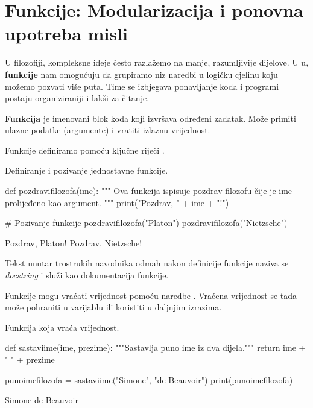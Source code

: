 \section{Funkcije: Modularizacija i ponovna upotreba misli}
\label{sec:funkcije}

U filozofiji, kompleksne ideje često razlažemo na manje, razumljivije dijelove. U u, \textbf{funkcije} nam omogućuju da grupiramo niz naredbi u logičku cjelinu koju možemo pozvati više puta. Time se izbjegava ponavljanje koda i programi postaju organiziraniji i lakši za čitanje.

\begin{definicijaokvir}
    \textbf{Funkcija} je imenovani blok koda koji izvršava određeni zadatak. Može primiti ulazne podatke (argumente) i vratiti izlaznu vrijednost.
\end{definicijaokvir}

Funkcije definiramo pomoću ključne riječi .

\begin{primjerokvir}
    Definiranje i pozivanje jednostavne funkcije.
    \begin{pythoncode}
def pozdravifilozofa(ime):
    """
    Ova funkcija ispisuje pozdrav filozofu čije je ime
    prolijeđeno kao argument.
    """
    print("Pozdrav, " + ime + "!")

# Pozivanje funkcije
pozdravifilozofa("Platon")
pozdravifilozofa("Nietzsche")
    \end{pythoncode}
    \begin{codeoutput}
Pozdrav, Platon!
Pozdrav, Nietzsche!
    \end{codeoutput}
    Tekst unutar trostrukih navodnika odmah nakon definicije funkcije naziva se \textit{docstring} i služi kao dokumentacija funkcije.
\end{primjerokvir}

Funkcije mogu vraćati vrijednost pomoću naredbe . Vraćena vrijednost se tada može pohraniti u varijablu ili koristiti u daljnjim izrazima.

\begin{primjerokvir}
    Funkcija koja vraća vrijednost.
    \begin{pythoncode}
def sastaviime(ime, prezime):
    """Sastavlja puno ime iz dva dijela."""
    return ime + " " + prezime

punoimefilozofa = sastaviime("Simone", "de Beauvoir")
print(punoimefilozofa)
    \end{pythoncode}
    \begin{codeoutput}
Simone de Beauvoir
    \end{codeoutput}
\end{primjerokvir}

